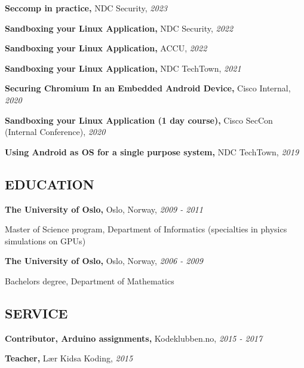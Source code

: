 \documentclass{article}
\newcommand\CVEntry[3]{
  {\bf #1,} #2, {\it #3}
}
\newcommand\CVComment[4]{
  \CVEntry{#1}{#2}{#3}

  #4
}
\begin{document}
\begin{addmargin}[2em]{0em}
  \CVEntry{Seccomp in practice}{NDC Security}{2023}

  \CVEntry{Sandboxing your Linux Application}{NDC Security}{2022}

  \CVEntry{Sandboxing your Linux Application}{ACCU}{2022}

  \CVEntry{Sandboxing your Linux Application}{NDC TechTown}{2021}

  \CVEntry{Securing Chromium In an Embedded Android Device}{Cisco Internal}{2020}

  \CVEntry{Sandboxing your Linux Application (1 day course)}{Cisco SecCon (Internal Conference)}{2020}

  \CVEntry{Using Android as OS for a single purpose system}{NDC TechTown}{2019}
\end{addmargin}


\subsection*{EDUCATION}

\begin{addmargin}[2em]{0em}
  \CVComment{The University of Oslo}{Oslo, Norway}{2009 - 2011}{
    Master of Science program, Department of Informatics (specialties in physics simulations on GPUs)}

  \CVComment{The University of Oslo}{Oslo, Norway}{2006 - 2009}{
    Bachelors degree, Department of Mathematics}
\end{addmargin}

\subsection*{SERVICE}

\begin{addmargin}[2em]{0em}
  \CVEntry{Contributor, Arduino assignments}{Kodeklubben.no}{2015 - 2017}

  \CVEntry{Teacher}{L\ae r Kidsa Koding}{2015}
\end{addmargin}
\end{document}
